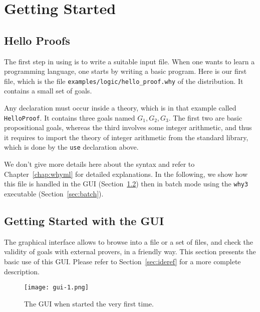 \chapter{Getting Started}
\label{chap:starting}

\section{Hello Proofs}

The first step in using \why is to write a suitable input
file. When one wants to learn a programming language, one starts by
writing a basic program. Here is our first \why file, which is the file
\texttt{examples/logic/hello\_proof.why} of the distribution.
It contains a small set of goals.


Any declaration must occur
inside a theory, which is in that example called \texttt{HelloProof}.
It contains three goals
named $G_1,G_2,G_3$. The first two are basic propositional goals,
whereas the third involves some integer arithmetic, and thus it
requires to import the theory of integer arithmetic from the \why
standard library, which is done by the \texttt{use} declaration above.

We don't give more details here about the syntax and refer to
Chapter~\ref{chap:whyml} for detailed explanations. In the following,
we show how this file is handled in the \why GUI
(Section~\ref{sec:gui}) then in batch mode using the \texttt{why3}
executable (Section~\ref{sec:batch}).


\section{Getting Started with the GUI}
\label{sec:gui}

The graphical interface allows to browse into a file or a set of
files, and check the validity of goals with external provers, in a
friendly way. This section presents the basic use of this GUI. Please
refer to Section~\ref{sec:ideref} for a more complete description.

\begin{figure}[tbp]
  \texttt{[image: gui-1.png]}
  \caption{The GUI when started the very first time.}
  \label{fig:gui1}
\end{figure}

